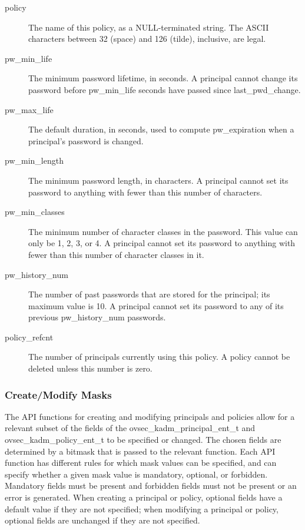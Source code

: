 \begin{description}
\item[policy] The name of this policy, as a NULL-terminated string.
The ASCII characters between 32 (space) and 126 (tilde), inclusive,
are legal.

\item[pw_min_life] The minimum password lifetime, in seconds.
A principal cannot change its password before pw_min_life seconds have
passed since last_pwd_change.

\item[pw_max_life] The default duration, in seconds, used to compute
pw_expiration when a principal's password is changed.

\item[pw_min_length] The minimum password length, in characters.  A
principal cannot set its password to anything with fewer than this
number of characters.

\item[pw_min_classes] The minimum number of character classes in the
password.  This value can only be 1, 2, 3, or 4.  A principal cannot
set its password to anything with fewer than this number of character
classes in it.

\item[pw_history_num] The number of past passwords that are
stored for the principal; its maximum value is 10.  A principal cannot
set its password to any of its previous pw_history_num passwords.

\item[policy_refcnt]  The number of principals currently using this policy.
A policy cannot be deleted unless this number is zero.
\end{description}

\subsubsection{Create/Modify Masks}
\label{sec:masks}

The API functions for creating and modifying principals and policies
allow for a relevant subset of the fields of the
ovsec_kadm_principal_ent_t and ovsec_kadm_policy_ent_t to be specified
or changed.  The chosen fields are determined by a bitmask that is
passed to the relevant function.  Each API function has different
rules for which mask values can be specified, and can specify whether
a given mask value is mandatory, optional, or forbidden.  Mandatory
fields must be present and forbidden fields must not be present or an
error is generated.  When creating a principal or policy, optional
fields have a default value if they are not specified; when modifying
a principal or policy, optional fields are unchanged if they are not
specified.

